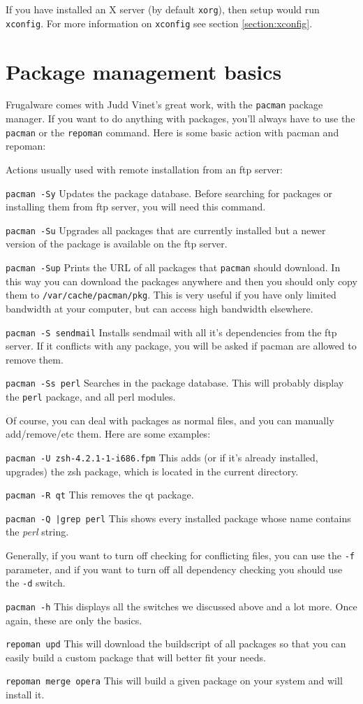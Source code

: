 If you have installed an X server (by default {\tt xorg}), then setup would run {\tt xconfig}. For more information on {\tt xconfig} see section \ref{section:xconfig}.

\section{Package management basics}

Frugalware comes with Judd Vinet's great work, with the
{\tt pacman} package manager. If you want to do anything
with packages, you'll always have to use the {\tt pacman}
or the {\tt repoman} command. Here is some basic action with pacman and repoman:

Actions usually used with remote installation from an ftp server:

{\tt pacman -Sy} Updates the package database. Before searching for packages or installing them from ftp server, you will need this command.

{\tt pacman -Su} Upgrades all packages that are currently installed but a newer version of the package is available on the ftp server.

{\tt pacman -Sup} Prints the URL of all packages that {\tt pacman} should download. In this way you can download the packages anywhere and then you should only copy them to {\tt /var/cache/pacman/pkg}. This is very useful if you have only limited bandwidth at your computer, but can access high bandwidth elsewhere.

{\tt pacman -S sendmail} Installs sendmail with all it's dependencies from the ftp server. If it conflicts with any package, you will be asked if pacman are allowed to remove them.

{\tt pacman -Ss perl} Searches in the package database. This will probably display the {\tt perl} package, and all perl modules.

Of course, you can deal with packages as normal files, and you can manually add/remove/etc them. Here are some examples:

{\tt pacman -U zsh-4.2.1-1-i686.fpm} This adds (or if it's
already installed, upgrades) the zsh package, which is
located in the current directory.

{\tt pacman -R qt} This removes the qt package.

{\tt pacman -Q |grep perl} This shows every installed package whose name contains the \textit{perl} string.

Generally, if you want to turn off checking for conflicting files, you can use the {\tt -f} parameter, and if you want to turn off all dependency checking you should use the {\tt -d} switch.

{\tt pacman -h} This displays all the switches we discussed above and a lot more. Once again, these are only the basics.

{\tt repoman upd} This will download the buildscript of all packages so that you can easily build a custom package that will better fit your needs.

{\tt repoman merge opera} This will build a given package on your system and will install it.